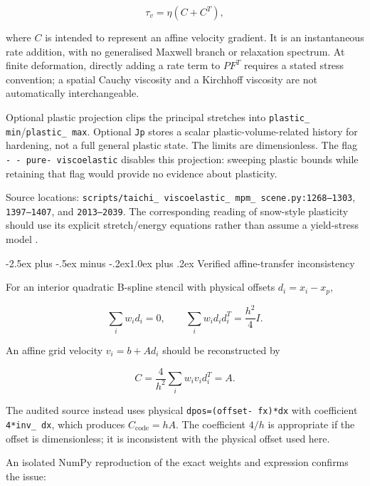 \documentclass[
  11pt,
]{article}
\makeatletter
\renewcommand\subsection{\needspace{5\baselineskip}\@startsection{subsection}{2}{\z@}%
  {-2.5ex plus -.5ex minus -.2ex}{1.0ex plus .2ex}%
  {\normalfont\sffamily\large\bfseries\color{accent}}}
\makeatother
\begin{document}
\[
\tau_v=\eta(C+C^T),
\]

where \(C\) is intended to represent an affine velocity gradient. It is
an instantaneous rate addition, with no generalised Maxwell branch or
relaxation spectrum. At finite deformation, directly adding a rate term
to \(PF^T\) requires a stated stress convention; a spatial Cauchy
viscosity and a Kirchhoff viscosity are not automatically
interchangeable.

Optional plastic projection clips the principal stretches into
\texttt{plastic\_ min}/\texttt{plastic\_ max}.
Optional \texttt{Jp} stores a scalar plastic-volume-related history for
hardening, not a full general plastic state. The limits are
dimensionless. The flag
\texttt{- - pure- viscoelastic}
disables this projection: sweeping plastic bounds while retaining that
flag would provide no evidence about plasticity.

Source locations:
\texttt{scripts/\allowbreak{}taichi\_ viscoelastic\_ mpm\_ scene.py:1268–1303},
\texttt{1397–1407}, and \texttt{2013–2039}. The corresponding reading of
snow-style plasticity should use its explicit stretch/energy equations
rather than assume a yield-stress model
.

\subsection{Verified affine-transfer
inconsistency}\label{verified-affine-transfer-inconsistency}

For an interior quadratic B-spline stencil with physical offsets
\(d_i=x_i-x_p\),

\[
\sum_iw_i d_i=0,
\qquad
\sum_iw_i d_i d_i^T=\frac{h^2}{4}I.
\]

An affine grid velocity \(v_i=b+Ad_i\) should be reconstructed by

\[
C=\frac{4}{h^2}\sum_iw_i v_i d_i^T=A.
\]

The audited source instead uses physical
\texttt{dpos=\allowbreak{}(offset- fx)\allowbreak{}*dx} with
coefficient \texttt{4*inv\_ dx}, which produces
\(C_{\mathrm{code}}=hA\). The coefficient \(4/h\) is appropriate if the
offset is dimensionless; it is inconsistent with the physical offset
used here.

An isolated NumPy reproduction of the exact weights and expression
confirms the issue:
\end{document}
